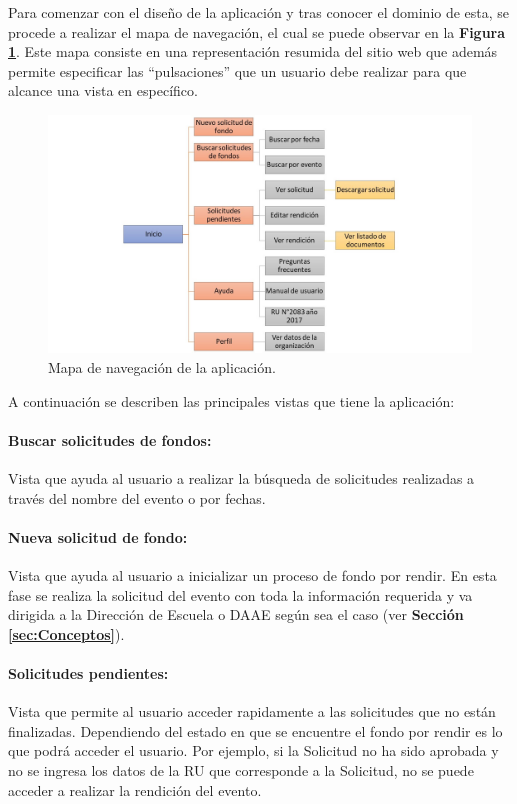 Para comenzar con el diseño de la aplicación y tras conocer el dominio de esta, se procede a realizar el mapa de navegación, el cual se puede observar en la \textbf{Figura \ref{fig: Mapa_navegacion}}. Este mapa consiste en una representación resumida del sitio web que además permite especificar las ``pulsaciones'' que un usuario debe realizar para que alcance una vista en específico.

\begin{figure}[h!tb]
    \hspace{-9mm}
    \includegraphics[width=1.1\textwidth]{Imagenes/Mapa_de_navegacion.jpg}
    \caption{\label{fig: Mapa_navegacion}Mapa de navegación de la aplicación.}
\end{figure}

A continuación se describen las principales vistas que tiene la aplicación:

\paragraph{Buscar solicitudes de fondos: }Vista que ayuda al usuario a realizar la búsqueda de solicitudes realizadas a través del nombre del evento o por fechas.

\paragraph{Nueva solicitud de fondo: }Vista que ayuda al usuario a inicializar un proceso de fondo por rendir. En esta fase se realiza la solicitud del evento con toda la información requerida y va dirigida a la Dirección de Escuela o DAAE según sea el caso (ver \textbf{Sección \ref{sec:Conceptos}}).

\paragraph{Solicitudes pendientes: }Vista que permite al usuario acceder rapidamente a las solicitudes que no están finalizadas. Dependiendo del estado en que se encuentre el fondo por rendir es lo que podrá acceder el usuario. Por ejemplo, si la Solicitud no ha sido aprobada y no se ingresa los datos de la RU que corresponde a la Solicitud, no se puede acceder a realizar la rendición del evento.

